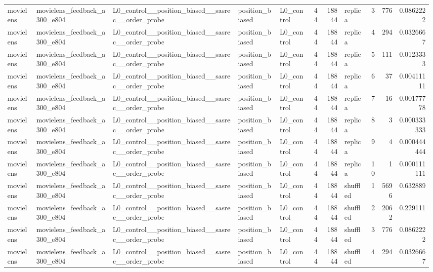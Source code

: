 \begin{table}[htbp!]
\begin{tabular}{lllllrrlrrr}
movielens & movielens\_feedback\_a300\_e804 & L0\_control\_\_position\_biased\_\_sasrec\_\_order\_probe & position\_biased & L0\_control & 44 & 18844 & replica & 3 & 776 & 0.0862222 \\
movielens & movielens\_feedback\_a300\_e804 & L0\_control\_\_position\_biased\_\_sasrec\_\_order\_probe & position\_biased & L0\_control & 44 & 18844 & replica & 4 & 294 & 0.0326667 \\
movielens & movielens\_feedback\_a300\_e804 & L0\_control\_\_position\_biased\_\_sasrec\_\_order\_probe & position\_biased & L0\_control & 44 & 18844 & replica & 5 & 111 & 0.0123333 \\
movielens & movielens\_feedback\_a300\_e804 & L0\_control\_\_position\_biased\_\_sasrec\_\_order\_probe & position\_biased & L0\_control & 44 & 18844 & replica & 6 & 37 & 0.00411111 \\
movielens & movielens\_feedback\_a300\_e804 & L0\_control\_\_position\_biased\_\_sasrec\_\_order\_probe & position\_biased & L0\_control & 44 & 18844 & replica & 7 & 16 & 0.00177778 \\
movielens & movielens\_feedback\_a300\_e804 & L0\_control\_\_position\_biased\_\_sasrec\_\_order\_probe & position\_biased & L0\_control & 44 & 18844 & replica & 8 & 3 & 0.000333333 \\
movielens & movielens\_feedback\_a300\_e804 & L0\_control\_\_position\_biased\_\_sasrec\_\_order\_probe & position\_biased & L0\_control & 44 & 18844 & replica & 9 & 4 & 0.000444444 \\
movielens & movielens\_feedback\_a300\_e804 & L0\_control\_\_position\_biased\_\_sasrec\_\_order\_probe & position\_biased & L0\_control & 44 & 18844 & replica & 10 & 1 & 0.000111111 \\
movielens & movielens\_feedback\_a300\_e804 & L0\_control\_\_position\_biased\_\_sasrec\_\_order\_probe & position\_biased & L0\_control & 44 & 18844 & shuffled & 1 & 5696 & 0.632889 \\
movielens & movielens\_feedback\_a300\_e804 & L0\_control\_\_position\_biased\_\_sasrec\_\_order\_probe & position\_biased & L0\_control & 44 & 18844 & shuffled & 2 & 2062 & 0.229111 \\
movielens & movielens\_feedback\_a300\_e804 & L0\_control\_\_position\_biased\_\_sasrec\_\_order\_probe & position\_biased & L0\_control & 44 & 18844 & shuffled & 3 & 776 & 0.0862222 \\
movielens & movielens\_feedback\_a300\_e804 & L0\_control\_\_position\_biased\_\_sasrec\_\_order\_probe & position\_biased & L0\_control & 44 & 18844 & shuffled & 4 & 294 & 0.0326667 \\

\end{tabular}
\end{table}
